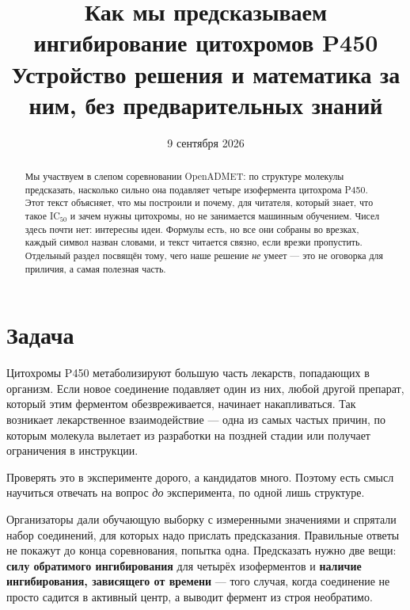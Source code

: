 \documentclass[11pt,a4paper]{article}
\title{\vspace{-16mm}\textbf{\Large Как мы предсказываем ингибирование цитохромов P450}\\[3mm]
\normalsize Устройство решения и математика за ним, без предварительных знаний}
\author{}
\date{\normalsize 9 сентября 2026}
\begin{document}
\maketitle
\thispagestyle{empty}

\begin{abstract}
\noindent
Мы участвуем в слепом соревновании OpenADMET: по структуре молекулы предсказать, насколько
сильно она подавляет четыре изофермента цитохрома P450. Этот текст объясняет, что мы построили
и почему, для читателя, который знает, что такое \textrm{IC}$_{50}$ и зачем нужны цитохромы,
но не занимается машинным обучением. Чисел здесь почти нет: интересны идеи. Формулы есть, но
все они собраны во врезках, каждый символ назван словами, и текст читается связно, если врезки
пропустить. Отдельный раздел посвящён тому, чего наше решение \emph{не} умеет --- это не
оговорка для приличия, а самая полезная часть.
\end{abstract}

\vspace{2mm}
\noindent{}

\vspace{3mm}
{\small\tableofcontents}
\vspace{4mm}

\section{Задача}

Цитохромы P450 метаболизируют большую часть лекарств, попадающих в организм. Если новое
соединение подавляет один из них, любой другой препарат, который этим ферментом
обезвреживается, начинает накапливаться. Так возникает лекарственное взаимодействие --- одна
из самых частых причин, по которым молекула вылетает из разработки на поздней стадии или
получает ограничения в инструкции.

Проверять это в эксперименте дорого, а кандидатов много. Поэтому есть смысл научиться отвечать
на вопрос \emph{до} эксперимента, по одной лишь структуре.

Организаторы дали обучающую выборку с измеренными значениями и спрятали набор соединений, для
которых надо прислать предсказания. Правильные ответы не покажут до конца соревнования,
попытка одна. Предсказать нужно две вещи: \textbf{силу обратимого ингибирования} для четырёх
изоферментов и \textbf{наличие ингибирования, зависящего от времени} --- того случая, когда
соединение не просто садится в активный центр, а выводит фермент из строя необратимо.
\end{document}
